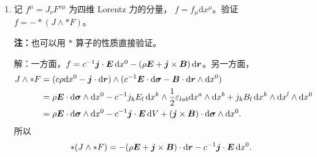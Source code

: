\begin{enumerate}
\item 记 $f^\mu=J_\nu F^{\nu \mu}$ 为四维 Lorentz 力的分量，
$f=f_\mu \mathrm{d} x^\mu$。验证 $f=-*(J \wedge * F)$。

\textbf{注：}也可以用 $*$ 算子的性质直接验证。

解：一方面，$f=c^{-1} \boldsymbol{j} \cdot \boldsymbol{E} \,{\rm d} x^{0}-(\rho \boldsymbol{E}+\boldsymbol{j} \times \boldsymbol{B}) \,{\rm d} \boldsymbol{r}$。另一方面，
\begin{align*}
J \wedge * F & =(c \rho {\rm d} x^{0}-\boldsymbol{j} \cdot {\rm d} \boldsymbol{r}) \wedge (c^{-1} \boldsymbol{E} \cdot {\rm d} \boldsymbol{\sigma}-\boldsymbol{B} \cdot {\rm d} \boldsymbol{r} \wedge {\rm d} x^{0}) \\
& = \rho \boldsymbol{E} \cdot {\rm d} \boldsymbol{\sigma} \wedge {\rm d} x^{0}-c^{-1} j_{k} E_{l} \,{\rm d} x^{k} \wedge \frac{1}{2} \varepsilon_{lab} {\rm d} x^{a} \wedge {\rm d} x^{b}+j_{k} B_{l} \,{\rm d} x^{k} \wedge {\rm d} x^{l} \wedge {\rm d} x^{0} \\
& = \rho \boldsymbol{E} \cdot {\rm d} \boldsymbol{\sigma} \wedge {\rm d} x^{0}-c^{-1} \boldsymbol{j} \cdot \boldsymbol{E} \,{\rm d} V+(\boldsymbol{j} \times \boldsymbol{B}) \cdot {\rm d} \boldsymbol{\sigma} \wedge {\rm d} x^{0}.
\end{align*}
所以
$$*(J \wedge * F)=-(\rho \boldsymbol{E}+\boldsymbol{j} \times \boldsymbol{B}) \cdot \mathrm{d} \boldsymbol{r}-c^{-1} \boldsymbol{j} \cdot \boldsymbol{E} \,{\rm d} x^{0}.$$
\end{enumerate}

